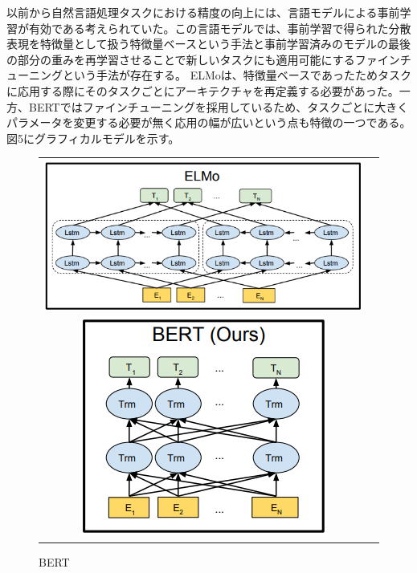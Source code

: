 \documentclass[uplatex]{jsarticle}
\begin{document}
以前から自然言語処理タスクにおける精度の向上には、言語モデルによる事前学習が有効である考えられていた。この言語モデルでは、事前学習で得られた分散表現を特徴量として扱う特徴量ベースという手法と事前学習済みのモデルの最後の部分の重みを再学習させることで新しいタスクにも適用可能にするファインチューニングという手法が存在する。
ELMoは、特徴量ベースであったためタスクに応用する際にそのタスクごとにアーキテクチャを再定義する必要があった。一方、BERTではファインチューニングを採用しているため、タスクごとに大きくパラメータを変更する必要が無く応用の幅が広いという点も特徴の一つである。
図5にグラフィカルモデルを示す。

\begin{figure}
    \begin{tabular}{cr}
        \begin{minipage}[b]{0.5\hsize}
            \begin{center}
                \includegraphics[scale=0.5]{picture/ELMo.png}
                \caption{ELMo}
            \end{center}
        \end{minipage}
        \hspace{1cm}
        \begin{minipage}[b]{0.5\hsize}
            \begin{center}
                \includegraphics[scale=0.5]{picture/BERT.png}
                \caption{BERT}
            \end{center}
        \end{minipage}
    \end{tabular}
\end{figure}
\end{document}
